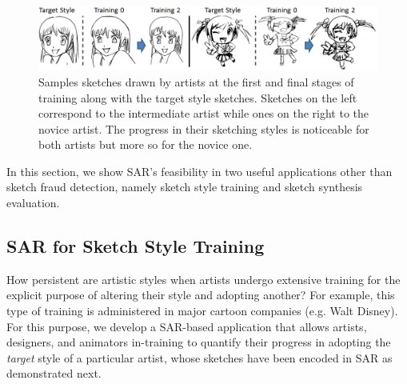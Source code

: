 \begin{figure}[htbp!]
\centering
\includegraphics[width = 1.0\textwidth]{images/trainingSamples}
\vspace{-4mm}\caption {Samples sketches drawn by artists at the first and final stages of training along with the target style sketches. Sketches on the left correspond to the intermediate artist while ones on the right to the novice artist. The progress in their sketching styles is noticeable for both artists but more so for the novice one.}
\label{trainingSamples}\vspace{-6mm}
\end{figure}

In this section, we show SAR's feasibility in two useful applications other than sketch fraud detection, namely sketch style training and sketch synthesis evaluation.


\vspace{-2mm}
\subsection{SAR for Sketch Style Training}
\vspace{-2mm}
How persistent are artistic styles when artists undergo extensive training for the explicit purpose of altering their style and adopting another? For example, this type of training is administered in major cartoon companies (e.g. Walt Disney). For this purpose, we develop a SAR-based application that allows artists, designers, and animators in-training to quantify their progress in adopting the \emph{target} style of a particular artist, whose sketches have been encoded in SAR as demonstrated next.




